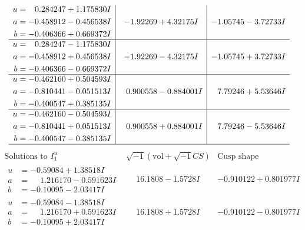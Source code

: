 \documentclass[1p]{elsarticle_modified}
\theoremstyle{definition}
\newcommand{\I}{\sqrt{-1}}
\begin{document}
$$\begin{array}{c|c|c}
\begin{aligned}
u &= \phantom{-}0.284247 + 1.175830 I \\
a &= -0.458912 - 0.456538 I \\
b &= -0.406366 + 0.669372 I\end{aligned}
 & -1.92269 + 4.32175 I & -1.05745 - 3.72733 I \\ \hline\begin{aligned}
u &= \phantom{-}0.284247 - 1.175830 I \\
a &= -0.458912 + 0.456538 I \\
b &= -0.406366 - 0.669372 I\end{aligned}
 & -1.92269 - 4.32175 I & -1.05745 + 3.72733 I \\ \hline\begin{aligned}
u &= -0.462160 + 0.504593 I \\
a &= -0.810441 - 0.051513 I \\
b &= -0.400547 + 0.385135 I\end{aligned}
 & \phantom{-}0.900558 - 0.884001 I & \phantom{-}7.79246 + 5.53646 I \\ \hline\begin{aligned}
u &= -0.462160 - 0.504593 I \\
a &= -0.810441 + 0.051513 I \\
b &= -0.400547 - 0.385135 I\end{aligned}
 & \phantom{-}0.900558 + 0.884001 I & \phantom{-}7.79246 - 5.53646 I\\
 \hline 
 \end{array}$$\newpage$$\begin{array}{c|c|c}  
\text{Solutions to }I^u_{1}& \I (\text{vol} + \sqrt{-1}CS) & \text{Cusp shape}\\
 \hline 
\begin{aligned}
u &= -0.59084 + 1.38518 I \\
a &= \phantom{-}1.216170 - 0.591623 I \\
b &= -0.10095 - 2.03417 I\end{aligned}
 & \phantom{-}16.1808 - 1.5728 I & -0.910122 + 0.801977 I \\ \hline\begin{aligned}
u &= -0.59084 - 1.38518 I \\
a &= \phantom{-}1.216170 + 0.591623 I \\
b &= -0.10095 + 2.03417 I\end{aligned}
 & \phantom{-}16.1808 + 1.5728 I & -0.910122 - 0.801977 I \\ \hline\begin{aligned}

\end{aligned}
\end{array}$$
\end{document}
